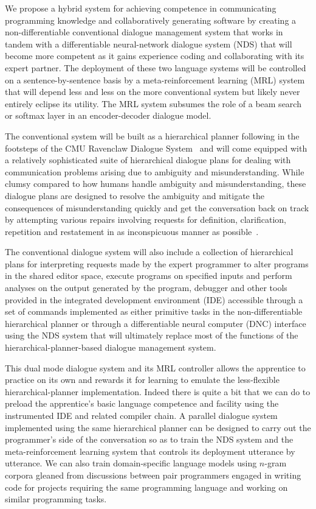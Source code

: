 We propose a hybrid system for achieving competence in communicating programming knowledge and collaboratively generating software by creating a non-differentiable conventional dialogue management system that works in tandem with a differentiable neural-network dialogue system (NDS) that will become more competent as it gains experience coding and collaborating with its expert partner. The deployment of these two language systems will be controlled on a sentence-by-sentence basis by a meta-reinforcement learning (MRL) system that will depend less and less on the more conventional system but likely never entirely eclipse its utility. The MRL system subsumes the role of a beam search or softmax layer in an encoder-decoder dialogue model. 


The conventional system will be built as a hierarchical planner following in the footsteps of the CMU Ravenclaw Dialogue System~\cite{BohusandRudnickyCSL-09} and will come equipped with a relatively sophisticated suite of hierarchical dialogue plans for dealing with communication problems arising due to ambiguity and misunderstanding. While clumsy compared to how humans handle ambiguity and misunderstanding, these dialogue plans are designed to resolve the ambiguity and mitigate the consequences of misunderstanding quickly and get the conversation back on track by attempting various repairs involving requests for definition, clarification, repetition and restatement in as inconspicuous manner as possible~\cite{BohusPhD-07}.

The conventional dialogue system will also include a collection of hierarchical plans for interpreting requests made by the expert programmer to alter programs in the shared editor space, execute programs on specified inputs and perform analyses on the output generated by the program, debugger and other tools provided in the integrated development environment (IDE) accessible through a set of commands implemented as either primitive tasks in the non-differentiable hierarchical planner or through a differentiable neural computer (DNC) interface using the NDS system that will ultimately replace most of the functions of the hierarchical-planner-based dialogue management system.

This dual mode dialogue system and its MRL controller allows the apprentice to practice on its own and rewards it for learning to emulate the less-flexible hierarchical-planner implementation. Indeed there is quite a bit that we can do to preload the apprentice's basic language competence and facility using the instrumented IDE and related compiler chain. A parallel dialogue system implemented using the same hierarchical planner can be designed to carry out the programmer's side of the conversation so as to train the NDS system and the meta-reinforcement learning system that controls its deployment utterance by utterance. We can also train domain-specific language models using $n$-gram corpora gleaned from discussions between pair programmers engaged in writing code for projects requiring the same programming language and working on similar programming tasks.

